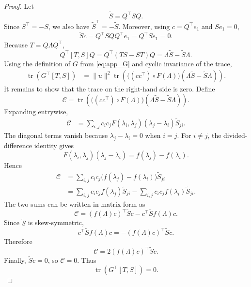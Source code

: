 \documentclass[10pt,a4paper]{amsart}
\begin{document}
\begin{proof}
Let
\[
    \widetilde S = Q^\top S Q .
\]
Since \(S^\top=-S\), we also have \(\widetilde S^\top=-\widetilde S\). Moreover,
using \(c=Q^\top e_1\) and \(Se_1=0\),
\[
    \widetilde S c
    =
    Q^\top S Q Q^\top e_1
    =
    Q^\top S e_1
    =
    0 .
\]
Because \(T=Q\Lambda Q^\top\),
\[
    Q^\top[T,S]Q
    =
    Q^\top(TS-ST)Q
    =
    \Lambda \widetilde S-\widetilde S\Lambda .
\]
Using the definition of \(G\) from \eqref{eq:app_G} and cyclic invariance of the trace,
\begin{align}
    \operatorname{tr}(G^\top[T,S])
    &=
    \|u\|^2
    \operatorname{tr}\!\left(
        \bigl((cc^\top)\circ F(\Lambda)\bigr)
        (\Lambda\widetilde S-\widetilde S\Lambda)
    \right).
\end{align}
It remains to show that the trace on the right-hand side is zero. Define
\[
    \mathcal{C}
    =
    \operatorname{tr}\!\left(
        \bigl((cc^\top)\circ F(\Lambda)\bigr)
        (\Lambda\widetilde S-\widetilde S\Lambda)
    \right).
\]
Expanding entrywise,
\begin{align}
    \mathcal{C}
    &=
    \sum_{i,j}
    c_i c_j F(\lambda_i,\lambda_j)
    (\lambda_j-\lambda_i)\widetilde S_{ji}.
    \label{eq:app_commutator_expansion}
\end{align}
The diagonal terms vanish because \(\lambda_j-\lambda_i=0\) when \(i=j\). For
\(i\neq j\), the divided-difference identity gives
\[
    F(\lambda_i,\lambda_j)(\lambda_j-\lambda_i)
    =
    f(\lambda_j)-f(\lambda_i).
\]
Hence
\begin{align}
    \mathcal{C}
    &=
    \sum_{i,j}
    c_i c_j
    \bigl(f(\lambda_j)-f(\lambda_i)\bigr)
    \widetilde S_{ji} \\
    &=
    \sum_{i,j}
    c_i c_j f(\lambda_j)\widetilde S_{ji}
    -
    \sum_{i,j}
    c_i c_j f(\lambda_i)\widetilde S_{ji}.
\end{align}
The two sums can be written in matrix form as
\[
    \mathcal{C}
    =
    (f(\Lambda)c)^\top \widetilde S c
    -
    c^\top \widetilde S f(\Lambda)c .
\]
Since \(\widetilde S\) is skew-symmetric,
\[
    c^\top \widetilde S f(\Lambda)c
    =
    - (f(\Lambda)c)^\top \widetilde S c .
\]
Therefore
\[
    \mathcal{C}
    =
    2(f(\Lambda)c)^\top \widetilde S c .
\]
Finally, \(\widetilde S c=0\), so \(\mathcal{C}=0\). Thus
\[
    \operatorname{tr}(G^\top[T,S])=0 .
\]
\end{proof}
\end{document}
